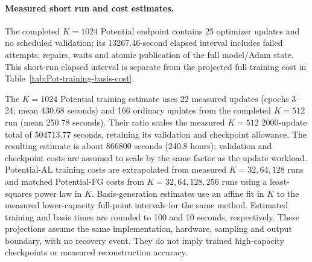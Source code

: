\paragraph{Measured short run and cost estimates.}
The completed $K=1024$ Potential endpoint contains 25 optimizer updates and no scheduled validation; its 13267.46-second elapsed interval includes failed attempts, repairs, waits and atomic publication of the full model/Adam state. This short-run elapsed interval is separate from the projected full-training cost in Table~\ref{tab:Pot-training-basis-cost}.

The $K=1024$ Potential training estimate uses 22 measured updates (epochs 3--24; mean 430.68 seconds) and 166 ordinary updates from the completed $K=512$ run (mean 250.78 seconds). Their ratio scales the measured $K=512$ 2000-update total of 504713.77 seconds, retaining its validation and checkpoint allowance. The resulting estimate is about 866800 seconds (240.8 hours); validation and checkpoint costs are assumed to scale by the same factor as the update workload. Potential-AL training costs are extrapolated from measured $K=32,64,128$ runs and matched Potential-FG costs from $K=32,64,128,256$ runs using a least-squares power law in $K$. Basis-generation estimates use an affine fit in $K$ to the measured lower-capacity full-point intervals for the same method. Estimated training and basis times are rounded to 100 and 10 seconds, respectively. These projections assume the same implementation, hardware, sampling and output boundary, with no recovery event. They do not imply trained high-capacity checkpoints or measured reconstruction accuracy.
